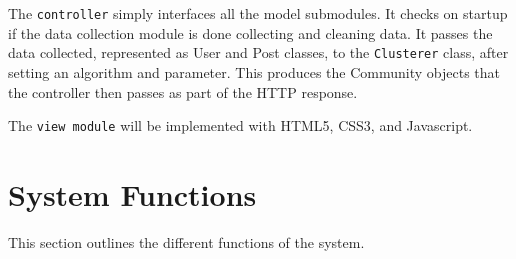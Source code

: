 The \texttt{controller} simply interfaces all the model submodules. It checks on startup if the data collection module is done collecting and cleaning data. It passes the data collected, represented as User and Post classes, to the \texttt{Clusterer} class, after setting an algorithm and parameter. This produces the Community objects that the controller then passes as part of the HTTP response.


The \texttt{view module} will be implemented with HTML5, CSS3, and Javascript. 


\section{System Functions}


This section outlines the different functions of the system.


\begin{comment}
\subsection{Collect Data}
\label{us:colldat}


The user prompts the system to collect new data to have a more updated dataset to extract communities from.


Pre-condition: The system is running. (This is automatically run on server startup.)


Scenario:
\begin{enumerate}
\item The user chooses to collect data.
\item The system collects data from Twitter and cleans the data.
\item The system displays a progress bar during this process.
\item The system notifies the user that data collection and cleaning is finished.
\end{enumerate}


Post-condition: The system now has an updated dataset to extract communities from.


Acceptance Criteria:
\begin{itemize}
\item Test if there is stored data. (User story \ref{us:gencom} should output proper communities.)
\item Test if data is clean.
\end{itemize}
\end{comment}


